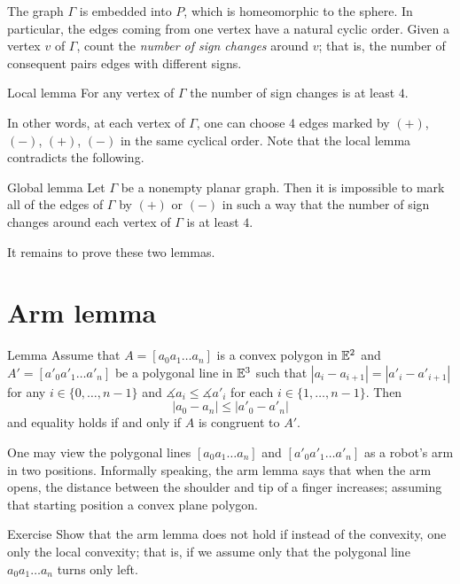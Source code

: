 The graph $\Gamma$ is embedded into $P$, which is homeomorphic to the sphere.
In particular, the edges coming from one vertex have a natural cyclic order. 
Given a vertex $v$ of $\Gamma$, count the \textit{number of sign changes} around $v$;
that is, the number of consequent pairs edges with different signs. 

\begin{thm}{Local lemma}\label{lem:local}
For any vertex of  $\Gamma$ the number of sign changes is at least $4$.
\end{thm}

In other words, at each vertex of $\Gamma$, one can choose 4 edges marked by $(+)$, $(-)$, $(+)$, $(-)$ in the same cyclical order.
Note that the local lemma contradicts the following.

\begin{thm}{Global lemma}\label{lem:global}
Let $\Gamma$ be a nonempty planar graph.
Then it is impossible to mark all of the edges of $\Gamma$ by $(+)$ or $(-)$
in such a way  that the number of sign changes around each vertex of $\Gamma$ is at least $4$.
\end{thm}

It remains to prove these two lemmas.
\qeds


\section{Arm lemma}

\begin{thm}{Lemma}\label{lem:arm}
Assume that $A=[a_0 a_1\dots a_n]$ is a convex polygon in $\mathbb{E}^2$
and $A'=[a'_0 a'_1\dots a'_n]$ be a polygonal line in $\mathbb{E}^3$
such that 
$|a_i-a_{i+1}|=|a'_i-a'_{i+1}|$ for any $i\in\{0,\dots,n-1\}$
and 
$\measuredangle a_i\le \measuredangle a'_i$
for each $i\in\{1,\dots,n-1\}$.
Then 
$$|a_0-a_n|\le |a'_0-a'_n|$$
and equality holds if and only if $A$ is congruent to $A'$.
\end{thm}

One may view the polygonal lines $[a_0a_1\dots a_n]$ and $[a'_0a'_1\dots a'_n]$ as a robot's arm in two positions.
Informally speaking, the arm lemma says that when the arm opens,
the distance between the shoulder and tip of a finger increases;
assuming that starting position a convex plane polygon.

\begin{thm}{Exercise}\label{ex:arm-nonconvex}
Show that the arm lemma does not hold if 
instead of the convexity,
one only the local convexity;
that is, if we assume only that the polygonal line $a_0 a_1\dots a_n$ turns only left.
\end{thm}

